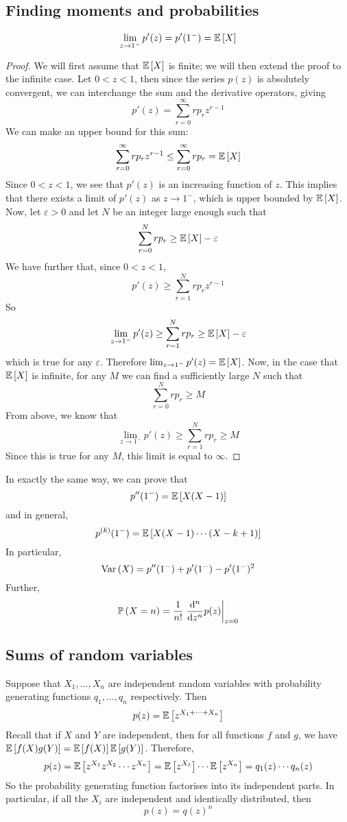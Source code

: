 \subsection{Finding moments and probabilities}
\begin{theorem}
	\[
		\lim_{z \to 1^-} p'(z) = p'(1^-) = \mathbb{E}\left[{X}\right]
	\]
\end{theorem}
\begin{proof}
	We will first assume that \(\mathbb{E}\left[{X}\right]\) is finite; we will then extend the proof to the infinite case.
	Let \(0 < z < 1\), then since the series \(p(z)\) is absolutely convergent, we can interchange the sum and the derivative operators, giving
	\[
		p'(z) = \sum_{r=0}^\infty r p_r z^{r-1}
	\]
	We can make an upper bound for this sum:
	\[
		\sum_{r=0}^\infty r p_r z^{r-1} \leq \sum_{r=0}^\infty r p_r = \mathbb{E}\left[{X}\right]
	\]
	Since \(0 < z < 1\), we see that \(p'(z)\) is an increasing function of \(z\).
	This implies that there exists a limit of \(p'(z)\) as \(z \to 1^-\), which is upper bounded by \(\mathbb{E}\left[{X}\right]\).
	Now, let \(\varepsilon > 0\) and let \(N\) be an integer large enough such that
	\[
		\sum_{r = 0}^N rp_r \geq \mathbb{E}\left[{X}\right] - \varepsilon
	\]
	We have further that, since \(0 < z < 1\),
	\[
		p'(z) \geq \sum_{r=1}^N rp_r z^{r-1}
	\]
	So
	\[
		\lim_{z \to 1^-} p'(z) \geq \sum_{r=1}^N rp_r \geq \mathbb{E}\left[{X}\right] - \varepsilon
	\]
	which is true for any \(\varepsilon\).
	Therefore \(\lim_{z \to 1^-} p'(z) = \mathbb{E}\left[{X}\right]\).
	Now, in the case that \(\mathbb{E}\left[{X}\right]\) is infinite, for any \(M\) we can find a sufficiently large \(N\) such that
	\[
		\sum_{r = 0}^N rp_r \geq M
	\]
	From above, we know that
	\[
		\lim_{z \to 1^-} p'(z) \geq \sum_{r=1}^N rp_r \geq M
	\]
	Since this is true for any \(M\), this limit is equal to \(\infty\).
\end{proof}
\noindent In exactly the same way, we can prove that
\[
	p''(1^-) = \mathbb{E}\left[{X(X-1)}\right]
\]
and in general,
\[
	p^{(k)}(1^-) = \mathbb{E}\left[{X(X-1)\cdots(X-k+1)}\right]
\]
In particular,
\[
	\operatorname{Var}\left({X}\right) = p''(1^-) + p'(1^-) - p'(1^-)^2
\]
Further,
\[
	\prob{X = n} = \frac{1}{n!} \eval{\dv[n]{z} p(z)}_{z = 0}
\]

\subsection{Sums of random variables}
Suppose that \(X_1, \dots, X_n\) are independent random variables with probability generating functions \(q_1, \dots, q_n\) respectively.
Then
\[
	p(z) = \mathbb{E}\left[{z^{X_1 + \dots + X_n}}\right]
\]
Recall that if \(X\) and \(Y\) are independent, then for all functions \(f\) and \(g\), we have \(\mathbb{E}\left[{f(X)g(Y)}\right] = \mathbb{E}\left[{f(X)}\right]\mathbb{E}\left[{g(Y)}\right]\).
Therefore,
\[
	p(z) = \mathbb{E}\left[{z^{X_1} z^{X_2} \cdots z^{X_n}}\right] = \mathbb{E}\left[{z^{X_1}}\right] \cdots \mathbb{E}\left[{z^{X_n}}\right] = q_1(z) \cdots q_n(z)
\]
So the probability generating function factorises into its independent parts.
In particular, if all the \(X_i\) are independent and identically distributed, then
\[
	p(z) = q(z)^n
\]

